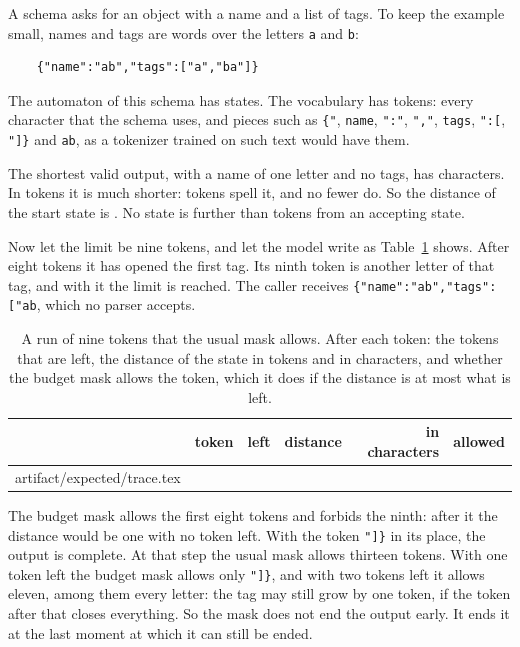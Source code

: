 \documentclass[acmsmall,nonacm,screen]{acmart}
\makeatletter
\newcommand{\str}[1]{\texttt{#1}}
\newcommand{\claim}[2]{#2}
\newcommand{\rows}[1]{\@@input artifact/expected/#1.tex }
\makeatother
\begin{document}
A schema asks for an object with a name and a list of tags. To keep the example small, names
and tags are words over the letters \str{a} and \str{b}:
\begin{verbatim}
    {"name":"ab","tags":["a","ba"]}
\end{verbatim}
The automaton of this schema has \exExampleStates{} states. The vocabulary has
\exExampleTokens{} tokens: every character that the schema uses, and pieces such as
\str{\{"}, \str{name}, \str{":"}, \str{","}, \str{tags}, \str{":[}, \str{"]\}} and \str{ab},
as a tokenizer trained on such text would have them.

\claim{example}{The shortest valid output, with a name of one letter and no tags, has
\exExampleCharacters{} characters. In tokens it is much shorter: \exExampleFar{} tokens
spell it, and no fewer do. So the distance of the start state is \exExampleFar{}. No state
is further than \exExampleWidest{} tokens from an accepting state.}

Now let the limit be nine tokens, and let the model write as Table~\ref{tab:trace} shows.
After eight tokens it has opened the first tag. Its ninth token is another letter of that
tag, and with it the limit is reached. The caller receives \str{\{"name":"ab","tags":["ab},
which no parser accepts.

\begin{table}
\caption{A run of nine tokens that the usual mask allows. After each token: the tokens that
are left, the distance of the state in tokens and in characters, and whether the budget mask
allows the token, which it does if the distance is at most what is left.}\label{tab:trace}
\begin{tabular}{rlrrrl}
\toprule
 & token & left & distance & in characters & allowed \\
\midrule
\rows{trace}
\bottomrule
\end{tabular}
\end{table}

\claim{example-trace}{The budget mask allows the first eight tokens and forbids the ninth:
after it the distance would be one with no token left. With the token \str{"]\}} in its
place, the output is complete.} \claim{example-cut}{At that step the usual mask allows
thirteen tokens. With one token left the budget mask allows only \str{"]\}}, and with two
tokens left it allows eleven, among them every letter: the tag may still grow by one token,
if the token after that closes everything.} So the mask does not end the output early. It
ends it at the last moment at which it can still be ended.
\end{document}
